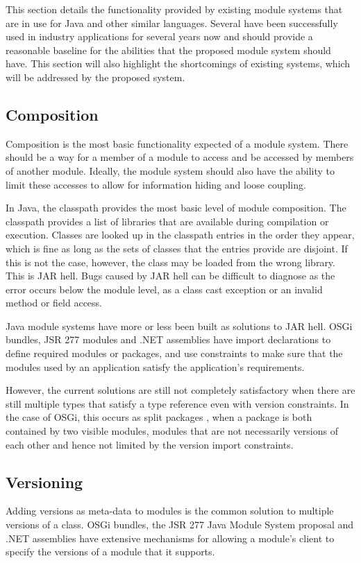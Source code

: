 This section details the functionality provided by existing module systems that
are in use for Java and other similar languages. 
Several \cite{javajars, OSGi4, netassemblies} have been successfully used in industry 
applications for several years now and should provide a reasonable baseline
for the abilities that the proposed module system should have. This section will also
highlight the shortcomings of existing systems, which will be addressed by the
proposed system.

\subsection{Composition}

Composition is the most basic functionality expected of a module system. There
should be a way for a member of a module to access and be accessed by members of
another module. Ideally, the module system should also have the ability to limit
these accesses to allow for information hiding and loose coupling.

In Java, the classpath provides the most basic level of module composition. 
The classpath provides a list of libraries that are
available during compilation or execution. Classes are looked up in the 
classpath entries in the order they appear, which is fine as long as the sets 
of classes that the entries provide are disjoint. If this is not the case, however, the class may
be loaded from the wrong library. This is JAR hell. Bugs caused by JAR hell
can be difficult to diagnose as the error occurs below the module level, as 
a class cast exception or an invalid method or field access.

Java module systems have more or less been built as solutions to JAR hell. 
OSGi \cite{OSGi4} bundles, JSR 277 modules \cite{JSR277} and .NET assemblies \cite{netassemblies}
have import declarations to define required modules or packages, and use constraints 
to make sure that the modules used by an application satisfy the 
application's requirements. 

However, the current solutions are still not completely satisfactory when there are still multiple
types that satisfy a type reference even with version constraints. In the case
of OSGi, this occurs as split packages \cite{iJAMComments}, when a package is both contained by
two visible modules, modules that are not necessarily versions of each other
and hence not limited by the version import constraints.

\subsection{Versioning}
Adding versions as meta-data to modules is the common solution to multiple
versions of a class. OSGi bundles, the JSR 277 Java Module System
proposal and .NET assemblies have extensive mechanisms for allowing a 
module's client to specify the versions of a module that it supports.

